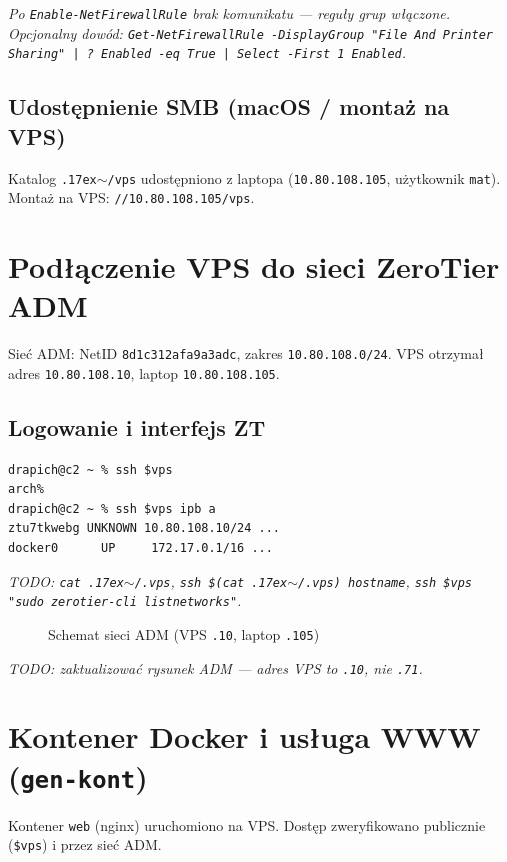 \documentclass[a4paper,11pt]{article}
\newcommand\TY{\raise.17ex\hbox{$\scriptstyle\mathtt{\sim}$}}
\begin{document}
\textit{Po \texttt{Enable-NetFirewallRule} brak komunikatu --- reguły grup włączone.
Opcjonalny dowód: \texttt{Get-NetFirewallRule -DisplayGroup "File And Printer Sharing" | ? Enabled -eq True | Select -First 1 Enabled}.}

\subsection{Udostępnienie SMB (macOS / montaż na VPS)}

Katalog \texttt{\TY/vps} udostępniono z laptopa (\texttt{10.80.108.105},
użytkownik \texttt{mat}). Montaż na VPS: \texttt{//10.80.108.105/vps}.

\section{Podłączenie VPS do sieci ZeroTier ADM}

Sieć ADM: NetID \texttt{8d1c312afa9a3adc}, zakres \texttt{10.80.108.0/24}.
VPS otrzymał adres \texttt{10.80.108.10}, laptop \texttt{10.80.108.105}.

\subsection{Logowanie i interfejs ZT}

\begin{lstlisting}
drapich@c2 ~ % ssh $vps
arch%
drapich@c2 ~ % ssh $vps ipb a
ztu7tkwebg UNKNOWN 10.80.108.10/24 ...
docker0      UP     172.17.0.1/16 ...
\end{lstlisting}

\textit{TODO: \texttt{cat \TY/.vps}, \texttt{ssh \$(cat \TY/.vps) hostname},
\texttt{ssh \$vps "sudo zerotier-cli listnetworks"}.}

\begin{figure}[H]
  \centering
  
  \caption{Schemat sieci ADM (VPS \texttt{.10}, laptop \texttt{.105})}
\end{figure}

\textit{TODO: zaktualizować rysunek ADM --- adres VPS to \texttt{.10}, nie \texttt{.71}.}

\section{Kontener Docker i usługa WWW (\texttt{gen-kont})}

Kontener \texttt{web} (nginx) uruchomiono na VPS. Dostęp zweryfikowano
publicznie (\texttt{\$vps}) i przez sieć ADM.
\end{document}
